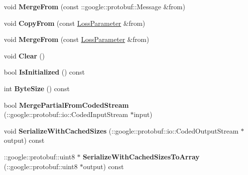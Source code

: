 \begin{DoxyCompactItemize}
void {\bfseries Merge\+From} (const \+::google\+::protobuf\+::\+Message \&from)
\item 
\mbox{\label{classcaffe_1_1_loss_parameter_ad6157cd303c8e5d54cc0db85c1d80a1d}} 
void {\bfseries Copy\+From} (const \mbox{\hyperlink{classcaffe_1_1_loss_parameter}{Loss\+Parameter}} \&from)
\item 
\mbox{\label{classcaffe_1_1_loss_parameter_a6652ae24e90ba5d58dfc7accb833df5c}} 
void {\bfseries Merge\+From} (const \mbox{\hyperlink{classcaffe_1_1_loss_parameter}{Loss\+Parameter}} \&from)
\item 
\mbox{\label{classcaffe_1_1_loss_parameter_abaa5d5454ed43ea0c8c383d095e86e5b}} 
void {\bfseries Clear} ()
\item 
\mbox{\label{classcaffe_1_1_loss_parameter_a0f371119a37e3be2955fecfec83aa252}} 
bool {\bfseries Is\+Initialized} () const
\item 
\mbox{\label{classcaffe_1_1_loss_parameter_ac65084a0e328225bd73a05d40530452f}} 
int {\bfseries Byte\+Size} () const
\item 
\mbox{\label{classcaffe_1_1_loss_parameter_ad67d52aa90c216430e74bc467a5a73c1}} 
bool {\bfseries Merge\+Partial\+From\+Coded\+Stream} (\+::google\+::protobuf\+::io\+::\+Coded\+Input\+Stream $\ast$input)
\item 
\mbox{\label{classcaffe_1_1_loss_parameter_a9aeb2b839eac5e1de6510d5a48b206a7}} 
void {\bfseries Serialize\+With\+Cached\+Sizes} (\+::google\+::protobuf\+::io\+::\+Coded\+Output\+Stream $\ast$output) const
\item 
\mbox{\label{classcaffe_1_1_loss_parameter_afdf4e575da071062673fce1ad79dbf46}} 
\+::google\+::protobuf\+::uint8 $\ast$ {\bfseries Serialize\+With\+Cached\+Sizes\+To\+Array} (\+::google\+::protobuf\+::uint8 $\ast$output) const
\item 
\mbox{\label{classcaffe_1_1_loss_parameter_aea065222a31f869ebabd9e520ea3ebeb}} 

\end{DoxyCompactItemize}
